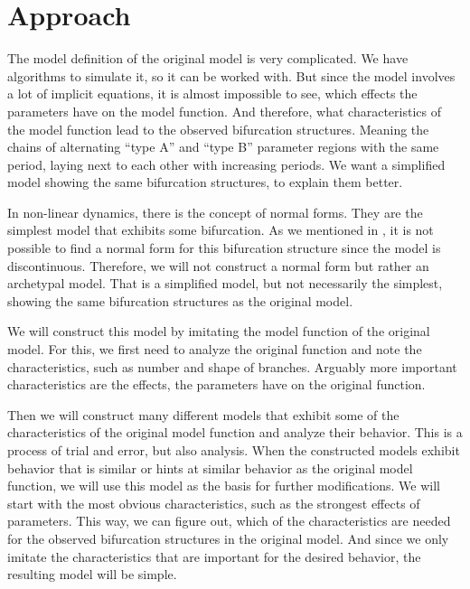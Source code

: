 \chapter{Approach}
\label{chap:approach}

The model definition of the original model is very complicated.
We have algorithms to simulate it, so it can be worked with.
But since the model involves a lot of implicit equations, it is almost impossible to see, which effects the parameters have on the model function.
And therefore, what characteristics of the model function lead to the observed bifurcation structures.
Meaning the chains of alternating ``type A'' and ``type B'' parameter regions with the same period, laying next to each other with increasing periods.
We want a simplified model showing the same bifurcation structures, to explain them better.

In non-linear dynamics, there is the concept of normal forms.
They are the simplest model that exhibits some bifurcation.
As we mentioned in , it is not possible to find a normal form for this bifurcation structure since the model is discontinuous.
Therefore, we will not construct a normal form but rather an archetypal model.
That is a simplified model, but not necessarily the simplest, showing the same bifurcation structures as the original model.

We will construct this model by imitating the model function of the original model.
For this, we first need to analyze the original function and note the characteristics, such as number and shape of branches.
Arguably more important characteristics are the effects, the parameters have on the original function.

Then we will construct many different models that exhibit some of the characteristics of the original model function and analyze their behavior.
This is a process of trial and error, but also analysis.
When the constructed models exhibit behavior that is similar or hints at similar behavior as the original model function, we will use this model as the basis for further modifications.
We will start with the most obvious characteristics, such as the strongest effects of parameters.
This way, we can figure out, which of the characteristics are needed for the observed bifurcation structures in the original model.
And since we only imitate the characteristics that are important for the desired behavior, the resulting model will be simple.
